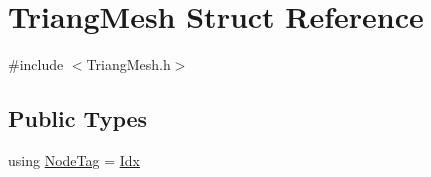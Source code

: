 \hypertarget{structTriangMesh}{}\section{Triang\+Mesh Struct Reference}
\label{structTriangMesh}


{\ttfamily \#include $<$Triang\+Mesh.\+h$>$}

\subsection*{Public Types}
\begin{DoxyCompactItemize}
\item 
using \hyperlink{structTriangMesh_a9883abab211497b807f24e6e46f4b8f6}{Node\+Tag} = \hyperlink{Includes_8h_ae78891cd308078a2f5f9e7193065c805}{Idx}
\end{DoxyCompactItemize}
